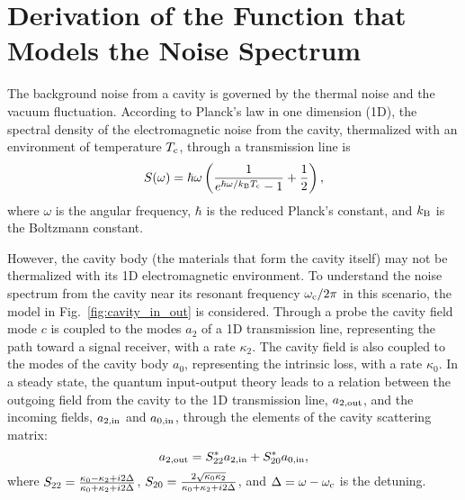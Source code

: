 \section{Derivation of the Function that Models the Noise Spectrum} 
\label{sec:cavitynoise}

The background noise from a cavity is governed by the thermal noise and the 
vacuum fluctuation. %
According to Planck's law in one dimension (1D), the spectral density of 
the electromagnetic noise from the cavity, thermalized with an environment of 
temperature $T_{\rm c}$, through a transmission line is 
\begin{equation}
\label{eq:cavity_thermal_spectral_density}
    S(\omega) = \hbar\omega \left( \frac{1}{e^{\hbar\omega/k_{\rm B}T_{\rm c}} - 1} +\frac{1}{2} \right),
\end{equation}
where $\omega$ is the angular frequency, $\hbar$ is the reduced Planck's 
constant, and $k_{\rm B}$ is the Boltzmann constant. 

However, the cavity body (the materials that form the cavity itself) may not 
be thermalized with its 1D electromagnetic environment. To understand the 
noise spectrum from the cavity near its 
resonant frequency $\omega_{\rm c}/2\pi$ in this scenario, the model in 
Fig.~\ref{fig:cavity_in_out} is considered. Through a probe the cavity field 
mode $c$ is coupled to the modes $a_2$ of a 1D transmission line, representing
 the path toward a signal receiver, with a rate $\kappa_2$. The cavity field 
is also coupled to the modes of the cavity body $a_0$, representing the 
intrinsic loss, with a rate $\kappa_0$. In a steady state, 
the quantum input-output theory leads to a relation between the outgoing field 
from the cavity to the 1D transmission line, $a_{\rm 2,out}$, and the incoming
 fields, $a_{\rm 2,in}$ and $a_{\rm 0,in}$, through the elements of the 
cavity scattering matrix:
\begin{equation} \label{eq:outgoing_field}
	 a_{\rm 2,out} = S^{*}_{\rm 22} a_{\rm 2,in} + S^{*}_{\rm 20} a_{\rm 0,in},
\end{equation}
where $S_{\rm 22} = \frac {\kappa_0 - \kappa_{\rm 2} + i 2 \Delta} {\kappa_0+\kappa_{\rm 2} + i 2 \Delta}$, $S_{\rm 20} = \frac {2\sqrt{\kappa_0 \kappa_{\rm 2}}} {\kappa_0+\kappa_{\rm 2} + i 2 \Delta}$,
and $\Delta = \omega-\omega_{\rm c}$ is the detuning. 


